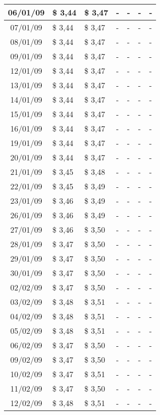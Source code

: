 \begin{center}
\begin{longtable}{|c|p{1.5cm}|p{1.5cm}|p{1.5cm}|p{1.5cm}|p{1.5cm}|p{1.5cm}|}
06/01/09 & \$ 3,44 & \$ 3,47 & - & - & - & - \\ \hline
07/01/09 & \$ 3,44 & \$ 3,47 & - & - & - & - \\ \hline
08/01/09 & \$ 3,44 & \$ 3,47 & - & - & - & - \\ \hline
09/01/09 & \$ 3,44 & \$ 3,47 & - & - & - & - \\ \hline
12/01/09 & \$ 3,44 & \$ 3,47 & - & - & - & - \\ \hline
13/01/09 & \$ 3,44 & \$ 3,47 & - & - & - & - \\ \hline
14/01/09 & \$ 3,44 & \$ 3,47 & - & - & - & - \\ \hline
15/01/09 & \$ 3,44 & \$ 3,47 & - & - & - & - \\ \hline
16/01/09 & \$ 3,44 & \$ 3,47 & - & - & - & - \\ \hline
19/01/09 & \$ 3,44 & \$ 3,47 & - & - & - & - \\ \hline
20/01/09 & \$ 3,44 & \$ 3,47 & - & - & - & - \\ \hline
21/01/09 & \$ 3,45 & \$ 3,48 & - & - & - & - \\ \hline
22/01/09 & \$ 3,45 & \$ 3,49 & - & - & - & - \\ \hline
23/01/09 & \$ 3,46 & \$ 3,49 & - & - & - & - \\ \hline
26/01/09 & \$ 3,46 & \$ 3,49 & - & - & - & - \\ \hline
27/01/09 & \$ 3,46 & \$ 3,50 & - & - & - & - \\ \hline
28/01/09 & \$ 3,47 & \$ 3,50 & - & - & - & - \\ \hline
29/01/09 & \$ 3,47 & \$ 3,50 & - & - & - & - \\ \hline
30/01/09 & \$ 3,47 & \$ 3,50 & - & - & - & - \\ \hline
02/02/09 & \$ 3,47 & \$ 3,50 & - & - & - & - \\ \hline
03/02/09 & \$ 3,48 & \$ 3,51 & - & - & - & - \\ \hline
04/02/09 & \$ 3,48 & \$ 3,51 & - & - & - & - \\ \hline
05/02/09 & \$ 3,48 & \$ 3,51 & - & - & - & - \\ \hline
06/02/09 & \$ 3,47 & \$ 3,50 & - & - & - & - \\ \hline
09/02/09 & \$ 3,47 & \$ 3,50 & - & - & - & - \\ \hline
10/02/09 & \$ 3,47 & \$ 3,51 & - & - & - & - \\ \hline
11/02/09 & \$ 3,47 & \$ 3,50 & - & - & - & - \\ \hline
12/02/09 & \$ 3,48 & \$ 3,51 & - & - & - & - \\ \hline

\end{longtable}
\end{center}

